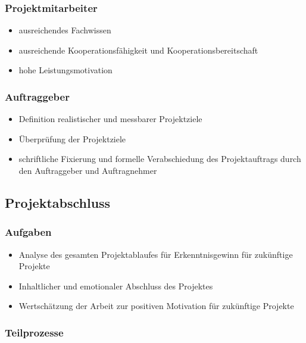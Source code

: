 \documentclass[11pt,a4paper]{article}
\begin{document}
\subsubsection{Projektmitarbeiter}

\begin{itemize}
\item ausreichendes Fachwissen
\item ausreichende Kooperationsfähigkeit und Kooperationsbereitschaft
\item hohe Leistungsmotivation
\end{itemize}

\subsubsection{Auftraggeber}

\begin{itemize}
\item Definition realistischer und messbarer Projektziele
\item Überprüfung der Projektziele
\item schriftliche Fixierung und formelle Verabschiedung des Projektauftrags durch den Auftraggeber
und Auftragnehmer
\end{itemize}

\subsection{Projektabschluss}

\subsubsection{Aufgaben}
\begin{itemize}
\item Analyse des gesamten Projektablaufes für Erkenntnisgewinn für
zukünftige Projekte
\item Inhaltlicher und emotionaler Abschluss des Projektes
\item Wertschätzung der Arbeit zur positiven Motivation für zukünftige Projekte
\end{itemize}

\subsubsection{Teilprozesse}
\end{document}
